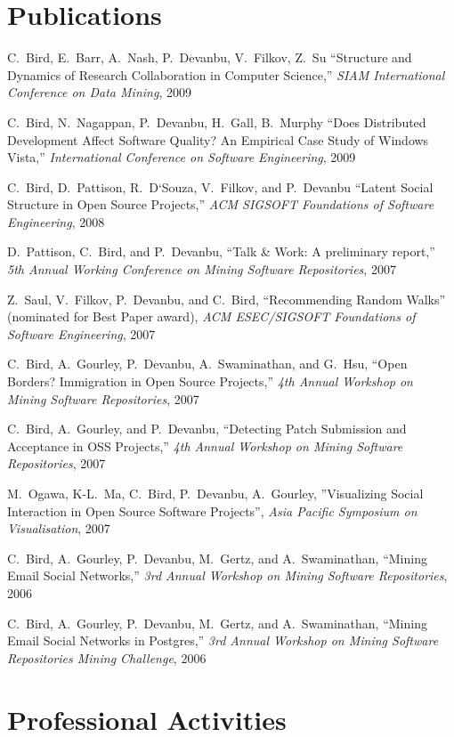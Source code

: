 \begin{resume}
\begin{tabular} {@{}l@{\hspace{3cm}}l}
\end{tabular}



\section{\secft Publications}

C.\ Bird, E.\ Barr, A.\ Nash, P.\ Devanbu, V.\ Filkov, Z.\ Su
``Structure and Dynamics of Research Collaboration in Computer Science,''
{\em SIAM International Conference on Data Mining}, 2009

C.\ Bird, N.\ Nagappan, P.\ Devanbu, H.\ Gall, B.\ Murphy
``Does Distributed Development Affect Software Quality? An Empirical Case Study of Windows Vista,''
{\em International Conference on Software Engineering}, 2009

C.\ Bird, D.\ Pattison, R.\ D`Souza, V.\ Filkov, and P.\ Devanbu 
``Latent Social Structure in Open Source Projects,''
{\em ACM SIGSOFT Foundations of Software Engineering}, 2008

D.\ Pattison, C.\ Bird, and P.\ Devanbu,
``Talk \& Work: A preliminary report,'' 
{\em 5th Annual Working Conference on Mining Software Repositories},
2007

Z.\ Saul, V.\ Filkov, P.\ Devanbu, and C.\ Bird,
``Recommending Random Walks'' (nominated for Best Paper award),
{\em ACM ESEC/SIGSOFT Foundations of Software Engineering}, 2007

C.\ Bird, A.\ Gourley, P.\ Devanbu, A.\ Swaminathan, and G.\ Hsu,
``Open Borders? Immigration in Open Source Projects,'' 
{\em 4th Annual Workshop on Mining Software Repositories},
2007

C.\ Bird, A.\ Gourley, and P.\ Devanbu,
``Detecting Patch Submission and Acceptance in OSS Projects,'' 
{\em 4th Annual Workshop on Mining Software Repositories},
2007

M.\ Ogawa, K-L.\ Ma, C.\ Bird, P.\ Devanbu, A.\ Gourley,
''Visualizing Social Interaction in Open Source Software Projects'',
{\em Asia Pacific Symposium on Visualisation},
2007

C.\ Bird, A.\ Gourley, P.\ Devanbu, M.\ Gertz, and A.\ Swaminathan,
``Mining Email Social Networks,''
{\em 3rd Annual Workshop on Mining Software Repositories},
2006

C.\ Bird, A.\ Gourley, P.\ Devanbu, M.\ Gertz, and A.\ Swaminathan,
``Mining Email Social Networks in Postgres,''
{\em 3rd Annual Workshop on Mining Software Repositories Mining Challenge},
2006

\section{\secft Professional Activities}


\end{resume}
